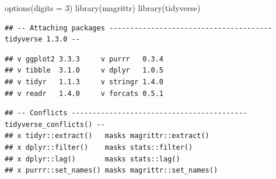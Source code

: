 \documentclass[
]{article}
\newenvironment{Shaded}{\begin{snugshade}}{\end{snugshade}}
\newcommand{\AttributeTok}[1]{\textcolor[rgb]{0.77,0.63,0.00}{#1}}
\newcommand{\DecValTok}[1]{\textcolor[rgb]{0.00,0.00,0.81}{#1}}
\newcommand{\FunctionTok}[1]{\textcolor[rgb]{0.00,0.00,0.00}{#1}}
\newcommand{\NormalTok}[1]{#1}
\begin{document}
\begin{Shaded}
\begin{Highlighting}[]
\FunctionTok{options}\NormalTok{(}\AttributeTok{digits =} \DecValTok{3}\NormalTok{)}
\FunctionTok{library}\NormalTok{(magrittr)}
\FunctionTok{library}\NormalTok{(tidyverse)}
\end{Highlighting}
\end{Shaded}

\begin{verbatim}
## -- Attaching packages --------------------------------------- tidyverse 1.3.0 --
\end{verbatim}

\begin{verbatim}
## v ggplot2 3.3.3     v purrr   0.3.4
## v tibble  3.1.0     v dplyr   1.0.5
## v tidyr   1.1.3     v stringr 1.4.0
## v readr   1.4.0     v forcats 0.5.1
\end{verbatim}

\begin{verbatim}
## -- Conflicts ------------------------------------------ tidyverse_conflicts() --
## x tidyr::extract()   masks magrittr::extract()
## x dplyr::filter()    masks stats::filter()
## x dplyr::lag()       masks stats::lag()
## x purrr::set_names() masks magrittr::set_names()
\end{verbatim}
\end{document}
